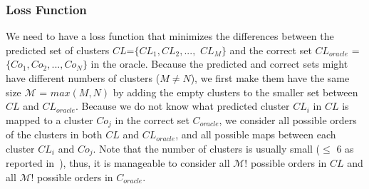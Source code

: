 \subsubsection*{{\bf Loss Function}}





We need to have a loss function that minimizes the differences between
the predicted set of clusters $CL$=$\{CL_1,CL_2, ...,$ $CL_M\}$ and
the correct set $CL_{oracle}$ = $\{Co_{1}, Co_{2},..., Co_{N}\}$ in
the oracle. Because the predicted and correct sets might have
different numbers of clusters ($M \neq N$), we first make them have
the same size $\mathcal{M}$ = $max(M,N)$ by adding the empty clusters
to the smaller set between $CL$ and $CL_{oracle}$.
%
Because we do not know what predicted cluster $CL_i$ in $CL$ is mapped
to a cluster $Co_j$ in the correct set $C_{oracle}$, we consider all
possible orders of the clusters in both $CL$ and $CL_{oracle}$, and
all possible maps between each cluster $CL_i$ and $Co_j$. Note that
the number of clusters is usually small ($\leq$ 6 as reported
in~\cite{nguyen-issre13}), thus, it is manageable to consider all
$\mathcal{M}!$ possible orders in $CL$ and all $\mathcal{M}!$ possible
orders in $C_{oracle}$.

